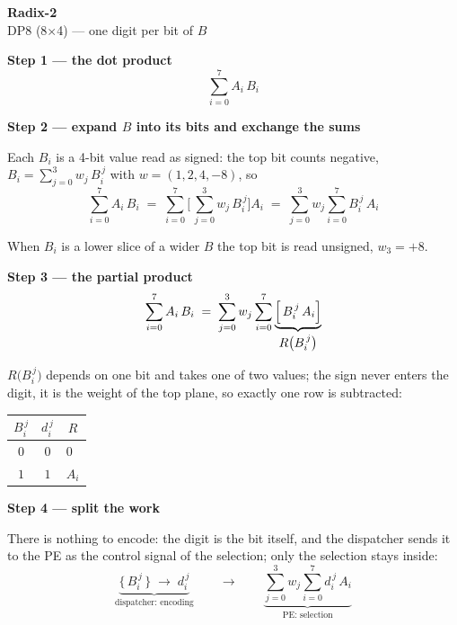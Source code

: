 \documentclass[fleqn]{article}
\newcommand{\Rf}{R\bigl(B_i^{\,j}\bigr)}
\begin{document}
\begin{center}
{\LARGE \textbf{Radix-2}}\\[4pt]
{\large DP8 (8$\times$4) --- one digit per bit of $B$}
\end{center}

\vspace{1.5em}

\noindent\textbf{Step 1 --- the dot product}
\[
\sum_{i=0}^{7} A_i \, B_i
\]

\vspace{0.5em}

\noindent\textbf{Step 2 --- expand $B$ into its bits and exchange the sums}

\noindent Each $B_i$ is a 4-bit value read as signed: the top bit counts negative,
$B_i = \sum_{j=0}^{3} w_j \, B_i^{\,j}$ with $w = (1, 2, 4, -8)$, so
\[
\sum_{i=0}^{7} A_i \, B_i
  \;=\; \sum_{i=0}^{7} \Biggl[\, \sum_{j=0}^{3} w_j \, B_i^{\,j} \Biggr] A_i
  \;=\; \sum_{j=0}^{3} w_j \sum_{i=0}^{7} B_i^{\,j} \, A_i
\]

\noindent When $B_i$ is a lower slice of a wider $B$ the top bit is read unsigned, $w_3 = +8$.

\vspace{0.5em}

\noindent\textbf{Step 3 --- the partial product}
\[
\sum_{i=0}^{7} A_i \, B_i
  \;=\; \sum_{j=0}^{3} w_j \sum_{i=0}^{7}
        \underbrace{\Bigl[\, B_i^{\,j} \, A_i \Bigr]}_{\textstyle \Rf}
\]

\noindent $\Rf$ depends on one bit and takes one of two values; the sign never enters
the digit, it is the weight of the top plane, so exactly one row is subtracted:

\vspace{0.5em}

\begin{center}
\renewcommand{\arraystretch}{1.2}
\begin{tabular}{c | c | l}
$B_i^{\,j}$ & $d_i^{\,j}$ & \multicolumn{1}{c}{$R$} \\
\hline
$0$ & $0$ & $0$ \\
$1$ & $1$ & $A_i$ \\
\end{tabular}
\end{center}

\vspace{0.8em}

\noindent\textbf{Step 4 --- split the work}

\noindent There is nothing to encode: the digit is the bit itself, and the dispatcher sends
it to the PE as the control signal of the selection; only the selection stays inside:
\[
\underbrace{\bigl\{\, B_i^{\,j} \,\bigr\} \;\longrightarrow\; d_i^{\,j}}_{\textstyle \text{dispatcher: encoding}}
\qquad\longrightarrow\qquad
\underbrace{\sum_{j=0}^{3} w_j \sum_{i=0}^{7} d_i^{\,j} \, A_i}_{\textstyle \text{PE: selection}}
\]
\end{document}
